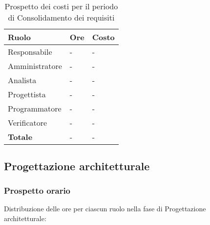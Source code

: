 		\begin{longtable}{ 
			>{\centering}p{} 
			>{\centering}p{}
			>{\centering\arraybackslash}p{} }
	
			\caption {Prospetto dei costi per il periodo di Consolidamento dei requisiti}		\\
			
			\textbf{\color{white}Ruolo} & 
			\textbf{\color{white}Ore} & 
			\textbf{\color{white}Costo}
			\tabularnewline  
			\endhead
			
			Responsabile & - & - \\
			Amministratore & - & - \\
			Analista & - & - \\
			Progettista & - & - \\
			Programmatore & - & - \\
			Verificatore & - & - \\
			\textbf{Totale} & - & - \\
		\end{longtable}
		

\subsection{Progettazione architetturale}
	\subsubsection{Prospetto orario}
		Distribuzione delle ore per ciascun ruolo nella fase di Progettazione architetturale:
		
